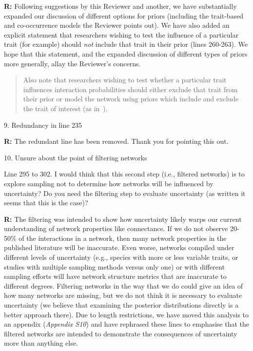 \documentclass[12pt]{letter}
\newenvironment{refquote}{\bigskip \begin{it}}{\end{it}\smallskip}
\begin{document}
		\textbf{R:} Following suggestions by this Reviewer and another, we have substantially expanded our discussion of different options for priors (including the trait-based and co-occurrence models the Reviewer points out). We have also added an explicit statement that researchers wishing to test the influence of a particular trait (for example) should \emph{not} include that trait in their prior (lines 260-263). We hope that this statement, and the expanded discussion of different types of priors more generally, allay the Reviewer's concerns. 


		\begin{quotation}
			Also note that researchers wishing to test whether a particular trait influences interaction probabilities should either exclude that trait from their prior or model the network using priors which include and exclude the trait of interest (as in~\citet{Weinstein2017,Weinstein2017a}).
		\end{quotation}


	9. Redundancy in line 235


		\textbf{R:} The redundant line has been removed. Thank you for pointing this out.


	10. Unsure about the point of filtering networks 


		\begin{refquote}
		Line 295 to 302.  I would think that this second step (i.e., filtered networks) is to explore sampling not to determine how networks will be influenced by uncertainty?  Do you need the filtering step to evaluate uncertainty (as written it seems that this is the case)?
		\end{refquote}


		\textbf{R:} The filtering was intended to show how uncertainty likely warps our current understanding of network properties like connectance. If we do not observe 20-50\% of the interactions in a network, then many network properties in the published literature will be inaccurate. Even worse, networks compiled under different levels of uncertainty (e.g., species with more or less variable traits, or studies with multiple sampling methods versus only one) or with different sampling efforts will have network structure metrics that are inaccurate to different degrees. Filtering networks in the way that we do could give an idea of how many networks are missing, but we do not think it is necessary to evaluate uncertainty (we believe that examining the posterior distributions directly is a better approach there). Due to length restrictions, we have moved this analysis to an appendix (\emph{Appendix S10}) and have rephrased these lines to emphasise that the filtered networks are intended to demonstrate the consequences of uncertainty more than anything else.
\end{document}
